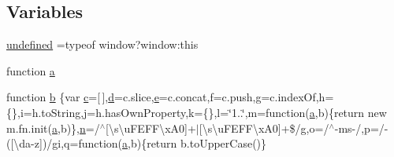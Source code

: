 \subsection*{Variables}
\begin{DoxyCompactItemize}
\item 
\hyperlink{assets_2js_2jquery-1_811_82_8min_8js_ae21cc36bf0d65014c717a481a3f8a468}{undefined} =typeof window?window\+:this
\item 
function \hyperlink{assets_2js_2jquery-1_811_82_8min_8js_aa4d4888597588a84fd5b1184d00c91f3}{a}
\item 
function \hyperlink{assets_2js_2jquery-1_811_82_8min_8js_ac0431efac4d7c393d1e70b86115cb93f}{b} \{var \hyperlink{assets_2js_2bootstrap_8min_8js_ad9d1ac02e33c4aed62ad517a7cb8b3fb}{c}=\mbox{[}$\,$\mbox{]},\hyperlink{assets_2js_2bootstrap_8min_8js_aeb337d295abaddb5ec3cb34cc2e2bbc9}{d}=c.\+slice,\hyperlink{assets_2js_2bootstrap_8min_8js_ab5902775854a8b8440bcd25e0fe1c120}{e}=c.\+concat,f=c.\+push,g=c.\+index\+Of,h=\{\},i=h.\+to\+String,j=h.\+has\+Own\+Property,k=\{\},l=\char`\"{}1..\char`\"{},m=function(\hyperlink{assets_2js_2bootstrap_8min_8js_a1f5870dcf487187f13d5fd328ed9e6e7}{a},b)\{return new m.\+fn.\+init(\hyperlink{assets_2js_2bootstrap_8min_8js_a1f5870dcf487187f13d5fd328ed9e6e7}{a},b)\},\hyperlink{cli_2error__general_8php_ace0fd03cd383f20ce6ea63247a207294}{n}=/$^\wedge$\mbox{[}\textbackslash{}s\textbackslash{}u\+F\+E\+F\+F\textbackslash{}x\+A0\mbox{]}+$\vert$\mbox{[}\textbackslash{}s\textbackslash{}u\+F\+E\+F\+F\textbackslash{}x\+A0\mbox{]}+\$/g,o=/$^\wedge$-\/ms-\//,p=/-\/(\mbox{[}\textbackslash{}da-\/z\mbox{]})/gi,q=function(\hyperlink{assets_2js_2bootstrap_8min_8js_a1f5870dcf487187f13d5fd328ed9e6e7}{a},b)\{return b.\+to\+Upper\+Case()\}
\item 

\end{DoxyCompactItemize}
